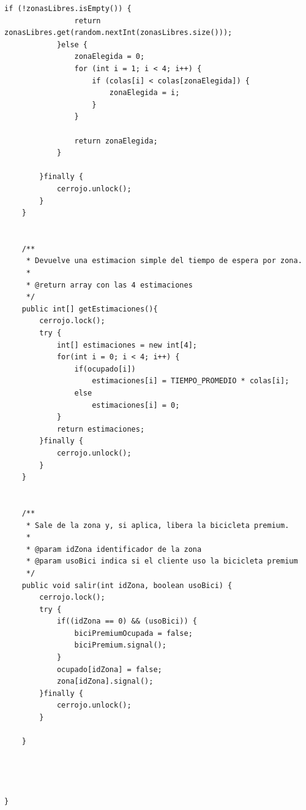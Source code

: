 \documentclass[12pt,a4paper]{article}
\begin{document}
\begin{lstlisting}[language={}, caption={ MonitorZonas.java}]
			if (!zonasLibres.isEmpty()) {
	            return zonasLibres.get(random.nextInt(zonasLibres.size()));
	        }else {
	        	zonaElegida = 0;
	            for (int i = 1; i < 4; i++) {
	                if (colas[i] < colas[zonaElegida]) { 
	                    zonaElegida = i;
	                }
	            }
	        	
	        	return zonaElegida;
	        }	
		
		}finally {
			cerrojo.unlock();
		}	
	}
	
	
	/**
	 * Devuelve una estimacion simple del tiempo de espera por zona.
	 *
	 * @return array con las 4 estimaciones
	 */
	public int[] getEstimaciones(){
		cerrojo.lock();
		try {
			int[] estimaciones = new int[4];
			for(int i = 0; i < 4; i++) {
				if(ocupado[i])
					estimaciones[i] = TIEMPO_PROMEDIO * colas[i];
				else
					estimaciones[i] = 0;
			}
			return estimaciones;
		}finally {
			cerrojo.unlock();
		}
	}
	
	
	/**
	 * Sale de la zona y, si aplica, libera la bicicleta premium.
	 *
	 * @param idZona identificador de la zona
	 * @param usoBici indica si el cliente uso la bicicleta premium
	 */
	public void salir(int idZona, boolean usoBici) {
		cerrojo.lock();
		try {
			if((idZona == 0) && (usoBici)) {
				biciPremiumOcupada = false;
				biciPremium.signal();
			}
			ocupado[idZona] = false;
			zona[idZona].signal();
		}finally {
			cerrojo.unlock();
		}
	
	}

	
	

}

\end{lstlisting}
\end{document}
